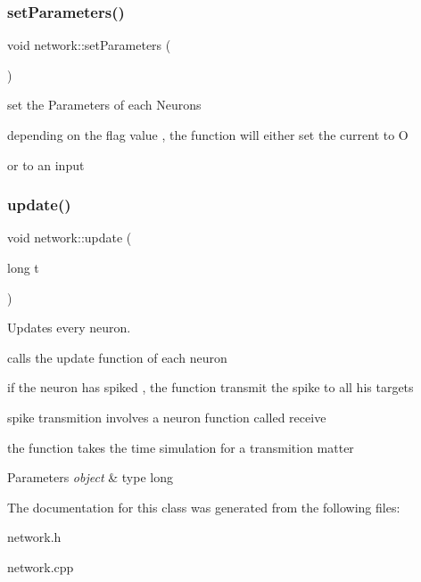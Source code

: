 \subsubsection{\texorpdfstring{set\+Parameters()}{setParameters()}}
{\footnotesize\ttfamily void network\+::set\+Parameters (\begin{DoxyParamCaption}{ }\end{DoxyParamCaption})}



set the Parameters of each Neurons 

depending on the flag value , the function will either set the current to O

or to an input \mbox{\label{classnetwork_a89f606204aa98943271e29f12b95f1ff}} 
\subsubsection{\texorpdfstring{update()}{update()}}
{\footnotesize\ttfamily void network\+::update (\begin{DoxyParamCaption}\item[{long}]{t }\end{DoxyParamCaption})}



Updates every neuron. 

calls the update function of each neuron

if the neuron has spiked , the function transmit the spike to all his targets

spike transmition involves a neuron function called receive

the function takes the time simulation for a transmition matter


\begin{DoxyParams}{Parameters}
{\em object} & type long \\
\hline
\end{DoxyParams}


The documentation for this class was generated from the following files\+:\begin{DoxyCompactItemize}
\item 
network.\+h\item 
network.\+cpp\end{DoxyCompactItemize}
